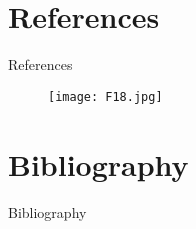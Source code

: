 \documentclass[pdflatex,compress,8pt,
	xcolor={dvipsnames,dvipsnames,svgnames,x11names,table},
	hyperref={
	breaklinks = true, 
	pdfauthor={Lemenkova Polina}, 
	pdfsubject={Preentation}, 
	pdfcreator={Lemenkova Polina}, 
	pdfproducer={Lemenkova Polina}, 
	citecolor=NavyBlue, 
	urlbordercolor=cyan,
	urlcolor = NavyBlue, 
	breaklinks = true}]{beamer}
\begin{document}
\section{References}
\begin{frame}{References}
\begin{figure}[H]
	\centering
		\texttt{[image: F18.jpg]}
\end{figure}
\end{frame}

\section{Bibliography}
\Large{Bibliography} \vspace{1em}
\nocite{*}
\printbibliography[heading=none]
\end{document}

